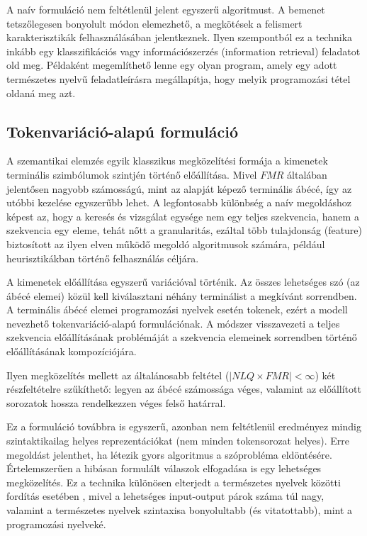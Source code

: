 \documentclass[twoside, 12pt]{report}
\begin{document}
A naív formuláció nem feltétlenül jelent egyszerű algoritmust. A bemenet tetszőlegesen bonyolult módon elemezhető, a megkötések a felismert karakterisztikák felhasználásában jelentkeznek. Ilyen szempontból ez a technika inkább egy klasszifikációs vagy információszerzés (information retrieval) feladatot old meg. Példaként megemlíthető lenne egy olyan program, amely egy adott természetes nyelvű feladatleírásra megállapítja, hogy melyik programozási tétel oldaná meg azt.\footnotemark{}


\subsection{Tokenvariáció-alapú formuláció}

A szemantikai elemzés egyik klasszikus megközelítési formája a kimenetek terminális szimbólumok szintjén történő előállítása. Mivel $FMR$ általában jelentősen nagyobb számosságú, mint az alapját képező terminális ábécé, így az utóbbi kezelése egyszerűbb lehet. A legfontosabb különbség a naív megoldáshoz képest az, hogy a keresés és vizsgálat egysége nem egy teljes szekvencia, hanem a szekvencia egy eleme, tehát nőtt a granularitás, ezáltal több tulajdonság (feature) biztosított az ilyen elven működő megoldó algoritmusok számára, például heurisztikákban történő felhasználás céljára.

A kimenetek előállítása egyszerű variációval történik. Az összes lehetséges szó (az ábécé elemei) közül kell kiválasztani néhány terminálist a megkívánt sorrendben. A terminális ábécé elemei programozási nyelvek esetén tokenek, ezért a modell nevezhető tokenvariáció-alapú formulációnak. A módszer visszavezeti a teljes szekvencia előállításának problémáját a szekvencia elemeinek sorrendben történő előállításának kompozíciójára.

Ilyen megközelítés mellett az általánosabb feltétel ($|NLQ \times FMR| < \infty$) két részfeltételre szűkíthető: legyen az ábécé számossága véges, valamint az előállított sorozatok hossza rendelkezzen véges felső határral.

Ez a formuláció továbbra is egyszerű, azonban nem feltétlenül eredményez mindig szintaktikailag helyes reprezentációkat (nem minden tokensorozat helyes). Erre megoldást jelenthet, ha létezik gyors algoritmus a szóprobléma eldöntésére. Értelemszerűen a hibásan formulált válaszok elfogadása is egy lehetséges megközelítés. Ez a technika különösen elterjedt a természetes nyelvek közötti fordítás esetében \parencite{BCB15a}, mivel a lehetséges input-output párok száma túl nagy, valamint a természetes nyelvek szintaxisa bonyolultabb (és vitatottabb), mint a programozási nyelveké.
\end{document}

